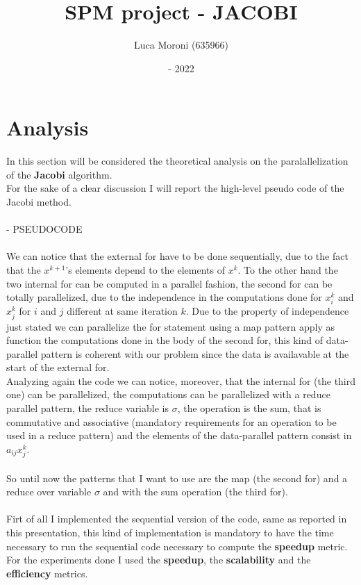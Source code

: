 \documentclass[12pt]{extarticle}
\title{SPM project - JACOBI}
\author{Luca Moroni (635966)}
\date{- 2022}
\begin{document}
\maketitle

\section{Analysis}
In this section will be considered the theoretical analysis on the paralallelization of the \textbf{Jacobi} algorithm.\\
For the sake of a clear discussion I will report the high-level pseudo code of the Jacobi method.\\\\

- PSEUDOCODE\\\\

We can notice that the external for have to be done sequentially, due to the fact that the $x^{k+1}$'s elements depend to the elements of $x^k$. To the other hand the two internal for can be computed in a parallel fashion, the second for can be totally parallelized, due to the independence in the computations done for $x_i^k$ and $x_j^k$ for $i$ and $j$ different at same iteration $k$. Due to the property of independence just stated we can parallelize the for statement using a map pattern apply as function the computations done in the body of the second for, this kind of data-parallel pattern is coherent with our problem since the data is availavable at the start of the external for.\\
Analyzing again the code we can notice, moreover, that the internal for (the third one) can be parallelized, the computations can be parallelized with a reduce parallel pattern, the reduce variable is $\sigma$, the operation is the sum, that is commutative and associative (mandatory requirements for an operation to be used in a reduce pattern) and the elements of the data-parallel pattern consist in $a_{ij}x_j^k$.\\\\
So until now the patterns that I want to use are the map (the second for) and a reduce over variable $\sigma$ and with the sum operation (the third for).\\\\
Firt of all I implemented the sequential version of the code, same as reported in this presentation, this kind of implementation is mandatory to have the time necessary to run the sequential code necessary to compute the \textbf{speedup} metric.\\
For the experiments done I used the \textbf{speedup}, the \textbf{scalability} and the \textbf{efficiency} metrics.



\end{document}
